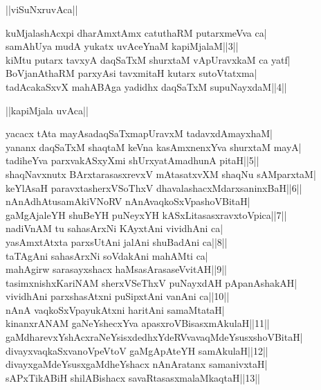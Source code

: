 \documentclass{article}
\begin{document}
\begin{center}
||viSuNxruvAca||
\end{center}

kuMjalashAcxpi dharAmxtAmx catuthaRM putarxmeVva ca|\\
samAhUya mudA yukatx uvAceYnaM kapiMjalaM||3||\\
kiMtu putarx tavxyA daqSaTxM shurxtaM vApUravxkaM ca yatf|\\
BoVjanAthaRM parxyAsi tavxmitaH kutarx sutoVtatxma|\\
tadAcakaSxvX mahABAga yadidhx daqSaTxM supuNayxdaM||4||\\

\begin{center}
||kapiMjala uvAca||
\end{center}

yacacx tAta mayAsadaqSaTxmapUravxM tadavxdAmayxhaM|\\
yananx daqSaTxM shaqtaM keVna kasAmxnenxYva shurxtaM mayA|\\
tadiheYva parxvakASxyXmi shUrxyatAmadhunA pitaH||5||\\
shaqNavxnutx BArxtarasasxrevxV mAtasatxvXM shaqNu sAMparxtaM|\\
keYlAsaH paravxtasherxVSoThxV dhavalashacxMdarxsaninxBaH||6||\\
nAnAdhAtusamAkiVNoRV nAnAvaqkoSxVpashoVBitaH|\\
gaMgAjaleYH shuBeYH puNeyxYH kASxLitasasxravxtoVpica||7||\\
nadiVnAM tu sahasArxNi KAyxtAni vividhAni ca|\\
yasAmxtAtxta parxsUtAni jalAni shuBadAni ca||8||\\
taTAgAni sahasArxNi soVdakAni mahAMti ca|\\
mahAgirw sarasayxshacx haMsasArasaseVvitAH||9||\\
tasimxnishxKariNAM sherxVSeThxV puNayxdAH pApanAshakAH|\\
vividhAni parxshasAtxni puSipxtAni vanAni ca||10||\\
nAnA vaqkoSxVpayukAtxni haritAni samaMtataH|\\
kinanxrANAM gaNeYshecxYva apasxroVBisasxmAkulaH||11||\\
gaMdharevxYshAcxraNeYsisxdedhxYdeRVvavaqMdeYsusxshoVBitaH|\\
divayxvaqkaSxvanoVpeVtoV gaMgApAteYH samAkulaH||12||\\
divayxgaMdeYsusxgaMdheYshacx nAnAratanx samanivxtaH|\\
sAPxTikABiH shilABishacx savaRtasasxmalaMkaqtaH||13||\\
\end{document}
